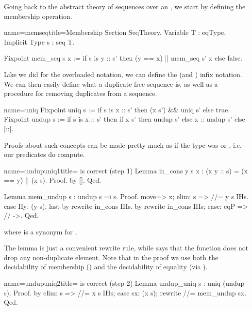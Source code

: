 Going back to the abstract theory of sequences over an ,
we start by defining the membership operation.

\begin{coq}{name=memseq}{title=Membership}
Section SeqTheory.
Variable T : eqType.
Implicit Type s : seq T.

Fixpoint mem_seq s x :=
  if s is y :: s' then (y == x) || mem_seq s' x else false.
\end{coq}

Like we did for the overloaded \C{==} notation, we can define the
\C{\\in} (and \C{\\notin}) infix notation.  We can then easily
define what a duplicate-free sequence is, as well as a procedure for
removing duplicates from a sequence. 

\begin{coq}{name=uniq}{}
Fixpoint uniq s :=
  if s is x :: s' then (x \notin s') && uniq s' else true.
Fixpoint undup s :=
  if s is x :: s' then
    if x \in s' then undup s' else x :: undup s'
  else [::].
\end{coq}

Proofs about such concepts can be made pretty much as if
the type  was  or , i.e. our predicates do
compute.

\begin{coq}{name=undupuniq1}{title= is correct (step 1)}
Lemma in_cons y s x : (x \in y :: s) = (x == y) || (x \in s).
Proof. by []. Qed.

Lemma mem_undup s : undup s =i s.
Proof.
move=> x; elim: s => //= y s IHs.
case Hy: (y \in s); last by rewrite in_cons IHs.
by rewrite in_cons IHs; case: eqP => // ->.
Qed.
\end{coq}
where  is a synonym for ,

The  lemma is just a convenient rewrite rule, while
 says that the  function does not drop
any non-duplicate element.  Note that in the proof we use both
the decidability of membership () and the decidability of
equality (via ).

\begin{coq}{name=undupuniq2}{title= is correct (step 2)}
Lemma undup_uniq s : uniq (undup s).
Proof.
by elim: s => //= x s IHs; case sx: (x \in s); rewrite //= mem_undup sx.
Qed.
\end{coq}

